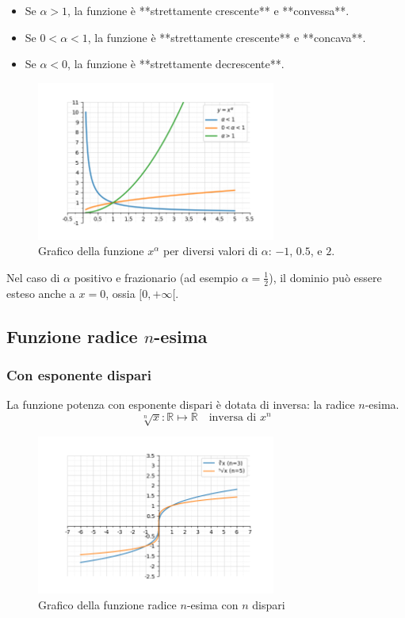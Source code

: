 \documentclass[oneside,10pt]{book} %
\begin{document}
\begin{itemize}
\item Se $\alpha > 1$, la funzione è **strettamente crescente** e **convessa**.
\item Se $0 < \alpha < 1$, la funzione è **strettamente crescente** e **concava**.
\item Se $\alpha < 0$, la funzione è **strettamente decrescente**.
\end{itemize}

\begin{figure}[H]
    \centering
    \includegraphics[width=0.7\textwidth]{./img/potenze_reali.png}
    \caption{Grafico della funzione $x^\alpha$ per diversi valori di $\alpha$: $-1$, $0.5$, e $2$.}
    \label{fig:potenze_reali}
\end{figure}
\FloatBarrier

Nel caso di $\alpha$ positivo e frazionario (ad esempio $\alpha = \frac{1}{2}$), il dominio può essere esteso anche a $x = 0$, ossia $[0, +\infty[$.


\subsection{Funzione radice $n$-esima}

\subsubsection{Con esponente dispari}
La funzione potenza con esponente dispari è dotata di inversa: la radice $n$-esima.
$$\sqrt[n]{x}: \mathbb{R} \mapsto \mathbb{R} \quad \text{inversa di } x^n$$

\begin{figure}[H]
    \centering
    \includegraphics[width=0.7\textwidth]{./img/radice_dispari.png}
    \caption{Grafico della funzione radice $n$-esima con $n$ dispari}
    \label{fig:radice_dispari}
\end{figure}
\FloatBarrier
\end{document}
